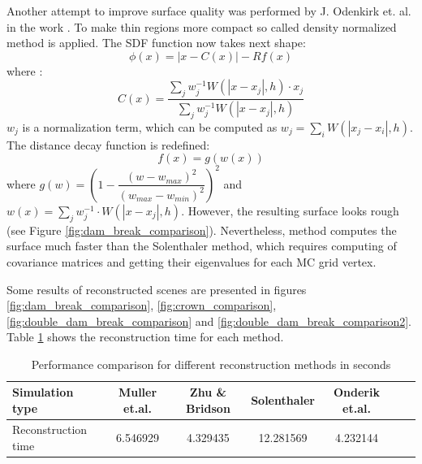 Another attempt to improve surface quality was performed by J. Odenkirk et. al. in the work \cite{OnderikEtAl}. To make thin regions more compact so called density normalized method is applied. The SDF function now takes next shape:
\begin{equation}
	\phi(x) = |x - C(x)| - Rf(x)
\end{equation}
where :
\begin{equation}
	C(x) = \dfrac{\sum_j w_j^{-1} W(|x - x_j|, h) \cdot x_j}{\sum_j w_j^{-1} W(|x - x_j|, h)}
\end{equation}
$w_j$ is a normalization term, which can be computed as $w_j = \sum_i W(|x_j - x_i|, h)$. The distance decay
function is redefined:
\begin{equation}
	f(x) = g(w(x))
\end{equation}
where $g(w) = (1 - \dfrac{(w - w_{max})^2}{(w_{max} - w_{min})^2})^2$ and $w(x) = \sum_j{w_j^{-1} \cdot W(|x - x_j|, h)}$. However, the resulting surface looks rough (see Figure \ref{fig:dam_break_comparison}). Nevertheless, method computes the surface much faster than the Solenthaler method, which requires computing of covariance matrices and getting their eigenvalues for each MC grid vertex.

Some results of reconstructed scenes are presented in figures \ref{fig:dam_break_comparison}, \ref{fig:crown_comparison}, \ref{fig:double_dam_break_comparison} and \ref{fig:double_dam_break_comparison2}. Table \ref{tab:reconstruction_time} shows the reconstruction time for each method.
\begin{table}[h]
	\begin{center}
		\scriptsize
		\begin{tabular}{|l|c|c|c|c|c|c|}
			\hline
			Simulation type & Muller et.al. & Zhu \& Bridson & Solenthaler & Onderik et.al. \\
			\hline
			Reconstruction time		&	6.546929	&	4.329435	&	12.281569	&	4.232144	\\
			\hline
		\end{tabular}
	\end{center}
	\caption{Performance comparison for different reconstruction methods in seconds}
	\label{tab:reconstruction_time}
\end{table}

